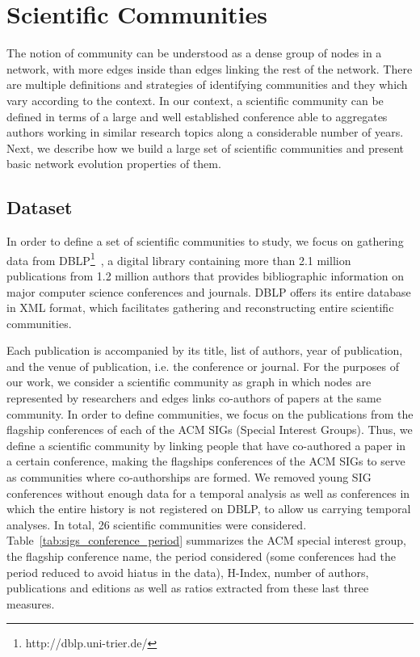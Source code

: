 \section{Scientific Communities}


The notion of community can be understood as a dense group of nodes in a network, with more edges inside than edges linking the rest of the network.  There are multiple definitions
and strategies of identifying communities and they which vary according to the context. In our context, a scientific community can be defined in terms of a large and well
established conference able to aggregates authors working in similar research topics along a considerable number of years.  Next, we describe how we build a large set of scientific
communities and present basic network evolution properties of them.


\subsection{Dataset}

In order to define a set of scientific communities to study, we focus on gathering data from DBLP\footnote{http://dblp.uni-trier.de/}~\cite{Ley:2009}, a digital library containing
more than 2.1 million publications from 1.2 million authors that provides bibliographic information on major computer science conferences and journals.  DBLP offers its entire
database in XML format, which facilitates gathering and reconstructing entire scientific communities. 

Each publication is accompanied by its title, list of authors, year of publication, and the venue of publication, i.e. the conference or journal. For the purposes of our work, we
consider a scientific community as graph in which nodes are represented by researchers and edges links co-authors of papers at the same community.  In order to define communities,
we focus on the publications from the flagship conferences of each of the ACM SIGs (Special Interest Groups).  Thus, we define a scientific community by linking people that have
co-authored a paper in a certain conference, making the flagships conferences of the ACM SIGs to serve as communities where co-authorships are formed.  We removed young SIG
conferences without enough data for a temporal analysis as well as conferences in which the entire history is not registered on DBLP, to allow us carrying temporal analyses. In
total, 26 scientific communities were considered. Table~\ref{tab:sigs_conference_period} summarizes the ACM special interest group, the flagship conference name, the period
considered (some conferences had the period reduced to avoid hiatus in the data), H-Index, number of authors, publications and editions as well as ratios extracted from these last
three measures.

